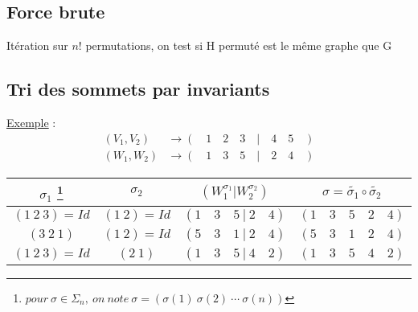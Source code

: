 \documentclass[a4paper, french, twoside]{article}
\begin{document}
\subsection{Force brute}
Itération sur $n!$ permutations, on test si H permuté est le même graphe que G

\subsection{Tri des sommets par invariants}
\newline \newline

\underline{Exemple} :
\begin{align*}
    (V_1,V_2) &\to ( \quad 1 \quad 2 \quad 3 \quad| \quad 4 \quad 5\quad ) \\
    (W_1,W_2) &\to ( \quad 1 \quad 3 \quad 5 \quad| \quad 2 \quad 4\quad )
\end{align*}
\begin{center}
\begin{tabular}{cccc}
    $\sigma_1$ 
    \footnote{$pour\ \sigma \in \Sigma_n ,\ on\ note\ \sigma = (\sigma(1)\ \sigma(2)\ \cdots\ \sigma(n)) $}
    & $\sigma_2$ & $(W_1^{\sigma_1}|W_2^{\sigma_2})$ & $\sigma = \tilde{\sigma_1} \circ \tilde{\sigma_2}$ \\
    \hline
    $(1\ 2\ 3)=Id$ & $(1\ 2)=Id$ & $( 1\quad 3\quad 5\ |\ 2\quad 4)$ & $(1\quad 3\quad 5\quad 2\quad 4)$ \\
    $(3\ 2\ 1)$ & $(1\ 2)=Id$ & $( 5\quad 3\quad 1\ |\ 2\quad 4)$ & $(5\quad 3\quad 1\quad 2\quad 4)$ \\
    $(1\ 2\ 3)=Id$ & $(2\ 1)$ & $( 1\quad 3\quad 5\ |\ 4\quad 2)$ & $(1\quad 3\quad 5\quad 4\quad 2)$ \\
\end{tabular}
\end{center}
\end{document}
